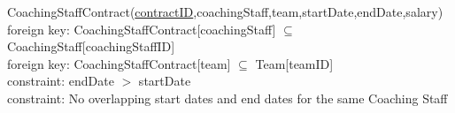 
{\color{ForestGreen}CoachingStaffContract(\underline{contractID},coachingStaff,team,startDate,endDate,salary)}\\
{\color{Orange}\hspace{2mm} foreign key: {\color{Magenta}CoachingStaffContract[coachingStaff] $\subseteq$ CoachingStaff[coachingStaffID]}} \\
{\color{Orange}\hspace{2mm} foreign key: {\color{Magenta}CoachingStaffContract[team] $\subseteq$ Team[teamID]}} \\
{\color{Orange}\hspace{2mm} constraint: {\color{Magenta}endDate $>$ startDate}} \\
{\color{Orange}\hspace{2mm} constraint: {\color{Magenta}No overlapping start dates and end dates for the same Coaching Staff}} \\

